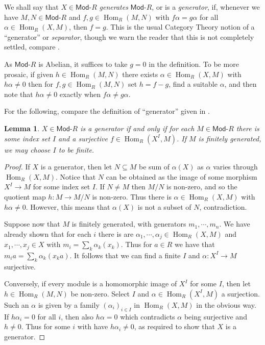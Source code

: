 \documentclass[a4paper,12pt]{article}
\theoremstyle{plain}
\newtheorem{lemma}[proposition]{Lemma}
\theoremstyle{definition}
\renewcommand{\mod}{\textsf{Mod-}}
\renewcommand{\hom}{\operatorname{Hom}}
\begin{document}
We shall say that $X\in\mod R$ \emph{generates} $\mod R$, or is a \emph{generator}, if, whenever we have $M,N\in\mod R$ and $f,g\in\hom_R(M,N)$ with $f \alpha = g \alpha$ for all $\alpha\in\hom_R(X,M)$, then $f=g$.  This is the usual Category Theory
notion of a ``generator'' or \emph{separator}, though we warn the reader that this is not completely settled,
compare \cite{qy1}.

As $\mod R$ is Abelian, it suffices to take $g=0$ in the definition.  To be more prosaic, if given $h\in\hom_R(M,N)$ there exists $\alpha\in\hom_R(X,M)$ with $h\alpha\not=0$ then for $f,g\in\hom_R(M,N)$ set $h=f-g$, find a suitable $\alpha$, and then note that $h\alpha\not=0$ exactly when $f\alpha \not= g\alpha$.

For the following, compare the definition of ``generator'' given in \cite[Chapter~XVII, Section~7]{lang}.

\begin{lemma}\label{lem:2}
$X\in\mod R$ is a generator if and only if for each $M\in\mod R$ there is some index set $I$ and a surjective
$f\in\hom_R(X^I,M)$.  If $M$ is finitely generated, we may choose $I$ to be finite.
\end{lemma}
\begin{proof}
If $X$ is a generator, then let $N\subseteq M$ be sum of $\alpha(X)$ as $\alpha$ varies through $\hom_R(X,M)$.
Notice that $N$ can be obtained as the image of some morphism $X^I\rightarrow M$ for some index set $I$.
If $N\not=M$ then $M/N$ is non-zero, and so the quotient map $h:M\rightarrow M/N$ is non-zero.  Thus there is
$\alpha\in\hom_R(X,M)$ with $h\alpha \not = 0$.  However, this means that $\alpha(X)$ is not a subset of $N$,
contradiction.

Suppose now that $M$ is finitely generated, with generators $m_1,\cdots,m_n$.  We have already shown that
for each $i$ there is are $\alpha_1,\cdots,\alpha_j \in \hom_R(X,M)$ and $x_1,\cdots,x_j\in X$ with
$m_i = \sum_k \alpha_k(x_k)$.  Thus for $a\in R$ we have that $m_i a = \sum_k \alpha_k(x_k a)$.  It follows
that we can find a finite $I$ and $\alpha:X^I\rightarrow M$ surjective.

Conversely, if every module is a homomorphic image of $X^I$ for some $I$, then let $h\in\hom_R(M,N)$ be non-zero.
Select $I$ and $\alpha\in \hom_R(X^I,M)$ a surjection.  Such an $\alpha$ is given by a family $(\alpha_i)_{i\in I}$
in $\hom_R(X,M)$ in the obvious way.  If $h\alpha_i=0$ for all $i$, then also $h\alpha=0$ which contradicts $\alpha$ being surjective and $h\not=0$.  Thus for some $i$ with have $h\alpha_i\not=0$, as required to show that $X$ is a generator.
\end{proof}
\end{document}
